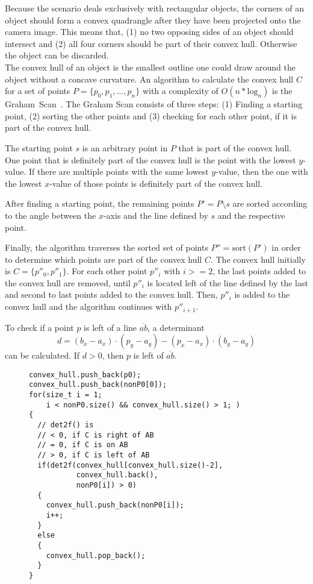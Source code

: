 Because the scenario deals exclusively with rectangular objects, the corners of an object should form a convex quadrangle after they have been projected onto the camera image. This means that, (1) no two opposing sides of an object should intersect and (2) all four corners should be part of their convex hull. Otherwise the object can be discarded. \\

The convex hull of an object is the smallest outline one could draw around the object without a concave curvature. An algorithm to calculate the convex hull $C$ for a set of points $P = \{p_0, p_1, \dots, p_n\}$ with a complexity of $O(n * \text{log}_n)$ is the Graham~Scan~\cite{graham_scan}. The Graham Scan consists of three steps: (1) Finding a starting point, (2) sorting the other points and (3) checking for each other point, if it is part of the convex hull.

The starting point $s$ is an arbitrary point in $P$ that is part of the convex hull. One point that is definitely part of the convex hull is the point with the lowest $y$-value. If there are multiple points with the same lowest $y$-value, then the one with the lowest $x$-value of those points is definitely part of the convex hull.

After finding a starting point, the remaining points $P' = P \setminus s$ are sorted according to the angle between the $x$-axis and the line defined by $s$ and the respective point.

Finally, the algorithm traverses the sorted set of points $P'' = \text{sort}(P')$ in order to determine which points are part of the convex hull $C$. The convex hull initially is $C = \{p''_0, p''_1\}$. For each other point $p''_i$ with $i >= 2$, the last points added to the convex hull are removed, until $p''_i$ is located left of the line defined by the last and second to last points added to the convex hull. Then, $p''_i$ is added to the convex hull and the algorithm continues with $p''_{i+1}$.

To check if a point $p$ is left of a line $\overline{a b}$, a determinant
\begin{equation*}
  d = (b_x - a_x) \cdot (p_y - a_y) - (p_x - a_x) \cdot (b_y - a_y)
\end{equation*}
can be calculated. If $d > 0$, then $p$ is left of $\overline{a b}$.\\

\begin{figure}[H]
  \begin{lstlisting}[caption=This C++ code example demonstrates how the Graham Scan algorithm determines the convex hull of an already sorted set of points.]
convex_hull.push_back(p0);
convex_hull.push_back(nonP0[0]);
for(size_t i = 1;
    i < nonP0.size() && convex_hull.size() > 1; )
{
  // det2f() is
  // < 0, if C is right of AB
  // = 0, if C is on AB
  // > 0, if C is left of AB
  if(det2f(convex_hull[convex_hull.size()-2],
           convex_hull.back(),
           nonP0[i]) > 0)
  {
    convex_hull.push_back(nonP0[i]);
    i++;
  }
  else
  {
    convex_hull.pop_back();
  }
}
  \end{lstlisting}
\end{figure}

